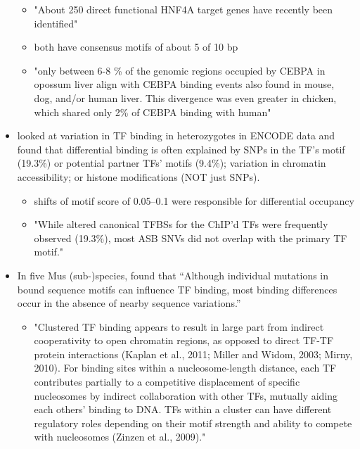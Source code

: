 \documentclass[9 pt]{article}
\begin{document}
\begin{itemize}
\begin{itemize}
            \item "About 250 direct functional HNF4A target genes have recently been identified"

            \item both have consensus motifs of about 5 of 10 bp

            \item "only between 6-8 \% of the genomic regions occupied by CEBPA in opossum liver align with CEBPA binding events also found in
                mouse, dog, and/or human liver. This divergence was even greater in chicken, which shared only 2\% of CEBPA binding with human"
        \end{itemize}

    \item \citet{shi2016evaluating} looked at variation in TF binding in heterozygotes in ENCODE data
        and found that differential binding is often explained by SNPs in the TF's motif (19.3\%) or potential partner TFs' motifs (9.4\%);
        variation in chromatin accessibility; or histone modifications (NOT just SNPs).
        \begin{itemize}
            \item shifts of motif score of 0.05--0.1 were responsible for differential occupancy
            \item "While altered canonical TFBSs for the ChIP'd TFs were frequently observed (19.3\%), most ASB SNVs did not overlap with the primary TF motif."
        \end{itemize}

    \item \citet{stefflova2013cooperativity} In five Mus (sub-)species, found that
        ``Although individual mutations in bound sequence motifs can influence TF binding, most binding differences occur in the absence of nearby sequence variations.''
        \begin{itemize}
            \item "Clustered TF binding appears to result in large part
                from indirect cooperativity to open chromatin regions, as opposed
                to direct TF-TF protein interactions (Kaplan et al., 2011; Miller
                and Widom, 2003; Mirny, 2010). For binding sites within a
                nucleosome-length distance, each TF contributes partially to a
                competitive displacement of specific nucleosomes by indirect
                collaboration with other TFs, mutually aiding each others’ binding
                to DNA. TFs within a cluster can have different regulatory roles
                depending on their motif strength and ability to compete with
                nucleosomes (Zinzen et al., 2009)." 
        \end{itemize}


\end{itemize}
\end{document}
